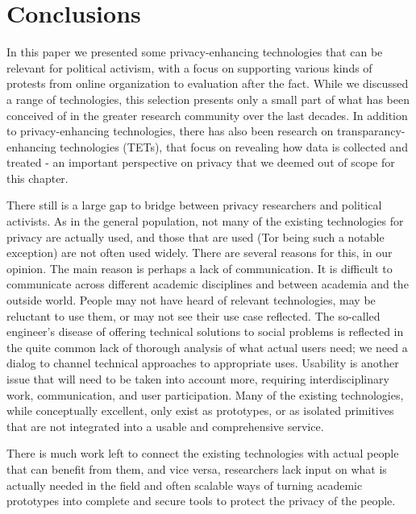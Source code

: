 \section{Conclusions}
\label{Conclusions}
In this paper we presented some privacy-enhancing technologies that can be 
relevant for political activism, with a focus on supporting various kinds of 
protests from online organization to evaluation after the fact. While we 
discussed a range of technologies, this selection presents only a small part of 
what has been conceived of in the greater research community over the last
decades. In addition to privacy-enhancing technologies, there has also
been research on transparancy-enhancing technologies (TETs), that
focus on revealing how data is collected and treated - an important
perspective on privacy that we deemed out of scope for this chapter.

There 
still is a large gap to bridge between privacy researchers and political 
activists. As in the general population, not many of the existing technologies 
for privacy are actually used, and those that are used (Tor being such 
a notable exception) are not often used widely. There are several reasons for 
this, in our opinion. The main reason is perhaps a lack of communication. It is 
difficult to communicate across different academic disciplines and between 
academia and the outside world. People may not have heard of relevant 
technologies, may be reluctant to use them, or may not see their use case 
reflected. The so-called engineer's disease of offering technical solutions to 
social problems is reflected in the quite common lack of thorough analysis of 
what actual users need; we need a dialog to channel technical
approaches to appropriate uses. Usability is another issue that will need to be taken 
into account more, requiring interdisciplinary work, communication, and user 
participation. Many of the existing technologies, while conceptually excellent, 
only exist as prototypes, or as isolated primitives that are not integrated 
into a usable and comprehensive service. 

There is much work left to connect the 
existing technologies with actual people that can benefit from them, and vice 
versa, researchers lack input on what is actually needed in the field and often 
scalable ways of turning academic prototypes into complete and secure tools to 
protect the privacy of the people.
